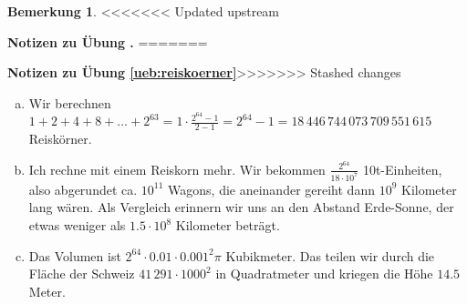 \documentclass[%
11pt,%
twoside,%
titlepage,%
swissgerman,%
headsepline%
]{scrartcl}
\newcommand{\faReturnGray}{\textcolor{gray}{\faMailReply}} %
\theoremstyle{definition}
\newtheorem{bem}{Bemerkung}[subsection] %
\theoremstyle{plain}
\newcommand{\concatueb}[1]{ueb:#1}%
\newcommand{\concatlsg}[1]{lsg:#1}%
\newcounter{uebcounter}[section]
\renewcommand{\theuebcounter}{\thesection.\arabic{uebcounter}}  %
\newenvironment{lsg}[1]{%
<<<<<<< Updated upstream
    \par\noindent\textbf{Notizen zu Übung \theuebcounter\label{\concatlsg{#1}}}
=======
    \par\noindent\textbf{Notizen zu Übung \ref{\concatueb{#1}}}\label{\concatlsg{#1}}
>>>>>>> Stashed changes
    \hfill\hyperref[\concatueb{#1}]{\faReturnGray}\par %
}{%
    \par%
}
\begin{document}
\begin{bem}
\begin{lsg}{reiskoerner}
    \begin{enumerate}[a)]
        \item Wir berechnen $1+2+4+8+\dots+2^{63}=1\cdot\frac{2^{64}-1}{2-1}=2^{64}-1=18\,446\,744\,073\,709\,551\,615$ Reiskörner.
        \item Ich rechne mit einem Reiskorn mehr. Wir bekommen $\frac{2^{64}}{18\cdot10^7}$ 10t-Einheiten, also abgerundet ca. $10^{11}$ Wagons, die aneinander gereiht dann $10^{9}$ Kilometer lang wären. Als Vergleich erinnern wir uns an den Abstand Erde-Sonne, der etwas weniger als $1.5\cdot10^8$ Kilometer beträgt.
        \item Das Volumen ist $2^{64}\cdot0.01\cdot0.001^2\pi$ Kubikmeter. Das teilen wir durch die Fläche der Schweiz $41\,291\cdot1000^2$ in Quadratmeter und kriegen die Höhe $14.5$ Meter.
    \end{enumerate}
\end{lsg}


\end{bem}
\end{document}
